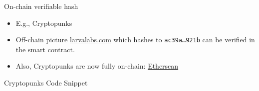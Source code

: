 \documentclass[handout]{beamer}
\begin{document}
\begin{frame}{On-chain verifiable hash}
	\begin{itemize}
		\item E.g., Cryptopunks
		\item Off-chain picture \link \href{https://www.larvalabs.com/public/images/cryptopunks/punks.png}{larvalabs.com} which hashes to \texttt{\scriptsize ac39a\dots 921b} can be verified in the smart contract.
		\item Also, Cryptopunks are now fully on-chain: \link \href{https://etherscan.io/address/0x16f5a35647d6f03d5d3da7b35409d65ba03af3b2}{Etherscan}  %
	\end{itemize}
	\begin{samplecode}{Cryptopunks Code Snippet}
		
	\end{samplecode}
\vspace{0.5em}
\end{frame}
\end{document}
